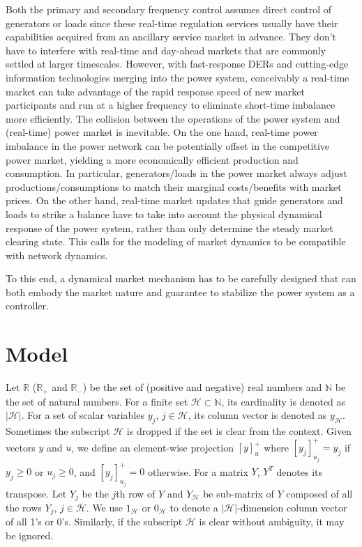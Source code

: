 \documentclass[journal,12pt,onecolumn,draftclsnofoot]{IEEEtran}
\begin{document}
Both the primary and secondary frequency control assumes direct control of generators or loads since these real-time regulation services usually have their capabilities acquired from an ancillary service market in advance. They don't have to interfere with real-time and day-ahead markets that are commonly settled at larger timescales. However, with fast-response DERs and cutting-edge information technologies merging into the power system, conceivably a real-time market can take advantage of the rapid response speed of new market participants and run at a higher frequency to eliminate short-time imbalance more efficiently. The collision between the operations of the power system and (real-time) power market is inevitable. On the one hand, real-time power imbalance in the power network can be potentially offset in the competitive power market, yielding a more economically efficient production and consumption. In particular, generators/loads in the power market always adjust productions/consumptions to match their marginal costs/benefits with market prices. On the other hand, real-time market updates that guide generators and loads to strike a balance have to take into account the physical dynamical response of the power system, rather than only determine the steady market clearing state. This calls for the modeling of market dynamics to be compatible with network dynamics.

To this end, a dynamical market mechanism has to be carefully designed that can both embody the market nature and guarantee to stabilize the power system as a controller.

     



   

\section{Model}

Let $\mathbb{R}$ ($\mathbb{R}_+$ and $\mathbb{R}_-$) be the set of (positive and negative) real numbers and $\mathbb{N}$ be the set of natural numbers. For a finite set $\mathcal{H} \subset \mathbb{N}$, its cardinality is denoted as $|\mathcal{H}|$. For a set of scalar variables $y_j$, $j\in\mathcal{H}$, its column vector is denoted as $y_{\mathcal{H}}$. Sometimes the subscript $\mathcal{H}$ is dropped if the set is clear from the context. Given vectors $y$ and $u$, we define an element-wise projection $[y]^+_{u}$ where $[y_j]^+_{u_j}=y_j$ if $y_j\ge 0$ or $u_j\ge 0$, and $[y_j]^+_{u_j}=0$ otherwise. 
For a matrix $Y$, $Y^T$ denotes its transpose. Let $Y_j$ be the $j$th row of $Y$ and $Y_\mathcal{H}$ be sub-matrix of $Y$ composed of all the rows $Y_j$, $j\in\mathcal{H}$. We use $1_\mathcal{H}$ or $0_{\mathcal{H}}$ to denote a $|\mathcal{H}|$-dimension column vector of all 1's or 0's. Similarly, if the subscript $\mathcal{H}$ is clear without ambiguity, it may be ignored. 
\end{document}
